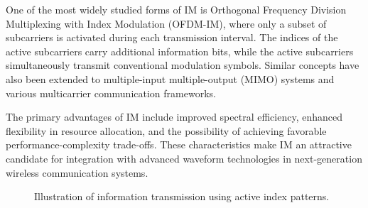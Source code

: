 One of the most widely studied forms of IM is Orthogonal Frequency Division Multiplexing with Index Modulation (OFDM-IM), where only a subset of subcarriers is activated during each transmission interval. The indices of the active subcarriers carry additional information bits, while the active subcarriers simultaneously transmit conventional modulation symbols. Similar concepts have also been extended to multiple-input multiple-output (MIMO) systems and various multicarrier communication frameworks.

The primary advantages of IM include improved spectral efficiency, enhanced flexibility in resource allocation, and the possibility of achieving favorable performance-complexity trade-offs. These characteristics make IM an attractive candidate for integration with advanced waveform technologies in next-generation wireless communication systems.

\begin{figure}[H]
\centering


\caption{Illustration of information transmission using active index patterns.}
\label{fig:index_modulation}

\end{figure}

